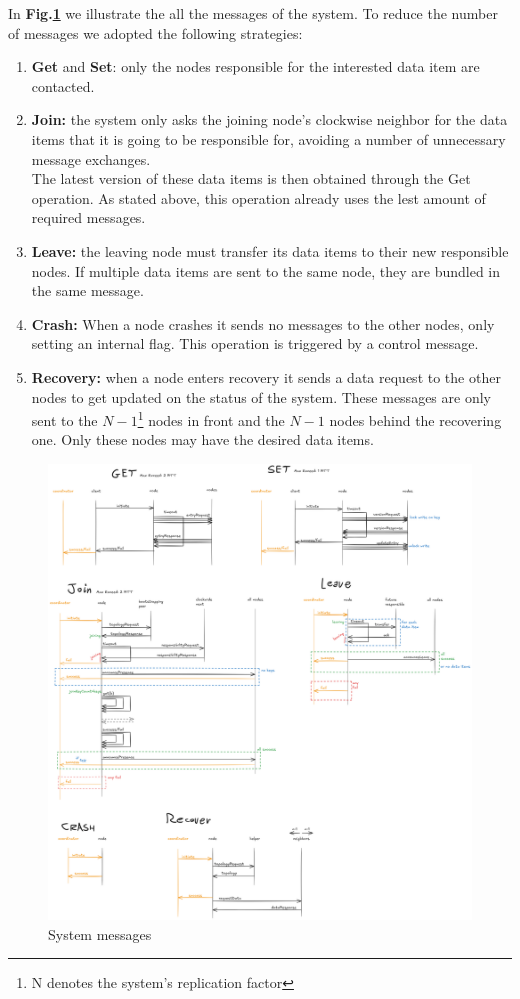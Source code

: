 \documentclass{article}
\begin{document}
In \textbf{Fig.\ref{fig:messages}} we illustrate the all the messages of the system. To reduce the number of messages we adopted the following strategies:
\begin{enumerate}
    \item \textbf{Get} and \textbf{Set}: only the nodes responsible for the interested data item are contacted.
    \item \textbf{Join:} the system only asks the joining node's clockwise neighbor for the data items that it is going to be responsible for, avoiding a number of unnecessary message exchanges.\\
        The latest version of these data items is then obtained through the Get operation. As stated above, this operation already uses the lest amount of required messages.
    \item \textbf{Leave:} the leaving node must transfer its data items to their new responsible nodes. If multiple data items are sent to the same node, they are bundled in the same message.
    \item \textbf{Crash:} When a node crashes it sends no messages to the other nodes, only setting an internal flag. This operation is triggered by a control message.
    \item \textbf{Recovery:} when a node enters recovery it sends a data request to the other nodes to get updated on the status of the system. These messages are only sent to the $N-1$\footnote{N denotes the system's replication factor} nodes in front and the $N-1$ nodes behind the recovering one. Only these nodes may have the desired data items.
\end{enumerate}

\begin{figure}
    \centering
    \includegraphics[width=1\linewidth]{images/messages.png}
    \caption{System messages}
    \label{fig:messages}
\end{figure}
\end{document}
